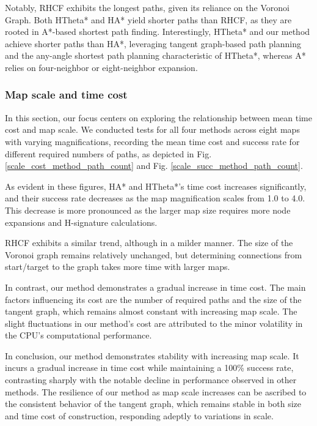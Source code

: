 \documentclass[letterpaper, 10 pt, journal, twoside]{IEEEtran}
\begin{document}
Notably, RHCF exhibits the longest paths, given its reliance on the Voronoi Graph. Both HTheta* and HA* yield shorter paths than RHCF, as they are rooted in A*-based shortest path finding. Interestingly, HTheta* and our method achieve shorter paths than HA*, leveraging tangent graph-based path planning and the any-angle shortest path planning characteristic of HTheta*, whereas A* relies on four-neighbor or eight-neighbor expansion.
     
\subsubsection{Map scale and time cost}

In this section, our focus centers on exploring the relationship between mean time cost and map scale. We conducted tests for all four methods across eight maps with varying magnifications, recording the mean time cost and success rate for different required numbers of paths, as depicted in Fig. \ref{scale_cost_method_path_count} and Fig. \ref{scale_succ_method_path_count}.

As evident in these figures, HA* and HTheta*'s time cost increases significantly, and their success rate decreases as the map magnification scales from 1.0 to 4.0. This decrease is more pronounced as the larger map size requires more node expansions and H-signature calculations.

RHCF exhibits a similar trend, although in a milder manner. The size of the Voronoi graph remains relatively unchanged, but determining connections from start/target to the graph takes more time with larger maps.

In contrast, our method demonstrates a gradual increase in time cost. The main factors influencing its cost are the number of required paths and the size of the tangent graph, which remains almost constant with increasing map scale. The slight fluctuations in our method's cost are attributed to the minor volatility in the CPU's computational performance.

In conclusion, our method demonstrates stability with increasing map scale. It incurs a gradual increase in time cost while maintaining a 100\% success rate, contrasting sharply with the notable decline in performance observed in other methods. The resilience of our method as map scale increases can be ascribed to the consistent behavior of the tangent graph, which remains stable in both size and time cost of construction, responding adeptly to variations in scale.
\end{document}
